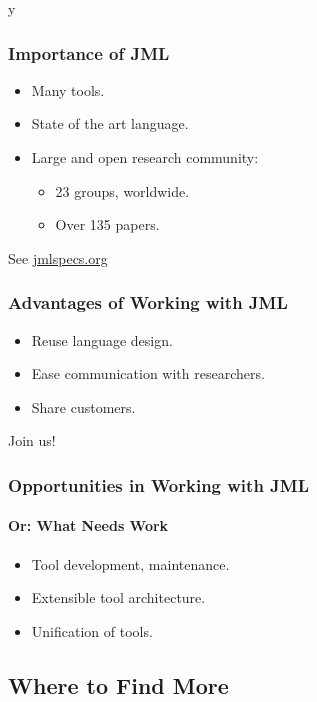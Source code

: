 \if y\MAKEHANDOUTS \documentclass[compress,landscape,handout]{beamer}
\begin{document}
\begin{frame}
\frametitle{Importance of JML}

\begin{itemize}
\item
Many tools.

\item
State of the art language.

\item
Large and open research community:
\begin{itemize}
\item
23 groups, worldwide.

\item
Over 135 papers.
\end{itemize}
\end{itemize}

See \href{http://www.jmlspecs.org}{jmlspecs.org}
\end{frame}

\begin{frame}
\frametitle{Advantages of Working with JML}

\begin{itemize}
\item
Reuse language design.

\item
Ease communication with researchers.

\item
Share customers.
\end{itemize}

Join us!
\end{frame}

\begin{frame}
\frametitle{Opportunities in Working with JML}
\framesubtitle{Or: What Needs Work}

\begin{itemize}
\item
Tool development, maintenance.

\item
Extensible tool architecture.

\item
Unification of tools.
\end{itemize}
\end{frame}

\subsection[Finding More]{Where to Find More}
\end{document}
